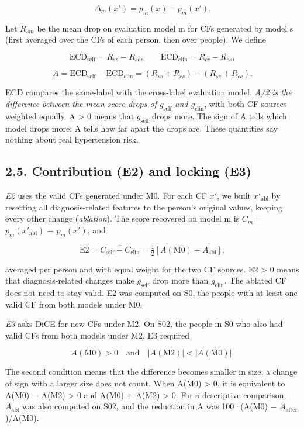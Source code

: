 \documentclass[
  11pt,
]{article}
\begin{document}
\[\Delta_m(x') = p_m(x) - p_m(x').\]

Let \(R_{sm}\) be the mean drop on evaluation model m for CFs generated
by model s (first averaged over the CFs of each person, then over
people). We define

\[\mathrm{ECD}_{\mathrm{self}} = R_{ss} - R_{sc}, \qquad \mathrm{ECD}_{\mathrm{clin}} = R_{cc} - R_{cs},\]

\[A = \mathrm{ECD}_{\mathrm{self}} - \mathrm{ECD}_{\mathrm{clin}} = (R_{ss}+R_{cs}) - (R_{sc}+R_{cc}).\]

ECD compares the same-label with the cross-label evaluation model.
\emph{A/2 is the difference between the mean score drops of
\(g_{\mathrm{self}}\) and \(g_{\mathrm{clin}}\)}, with both CF sources
weighted equally. A \textgreater{} 0 means that \(g_{\mathrm{self}}\)
drops more. The sign of A tells which model drops more;
\textbar A\textbar{} tells how far apart the drops are. These quantities
say nothing about real hypertension risk.

\subsection{2.5. Contribution (E2) and locking (E3)}

\emph{E2} uses the valid CFs generated under M0. For each CF \(x'\), we
built \(x'_{\mathrm{abl}}\) by resetting all diagnosis-related features
to the person's original values, keeping every other change
(\emph{ablation}). The score recovered on model m is \(C_m\) =
\(p_m(x'_{\mathrm{abl}})\) − \(p_m(x')\), and

\[\mathrm{E2} = \overline{C_{\mathrm{self}} - C_{\mathrm{clin}}} = \tfrac{1}{2}\left[A(\mathrm{M0}) - A_{\mathrm{abl}}\right],\]

averaged per person and with equal weight for the two CF sources. E2
\textgreater{} 0 means that diagnosis-related changes make
\(g_{\mathrm{self}}\) drop more than \(g_{\mathrm{clin}}\). The ablated
CF does not need to stay valid. E2 was computed on S0, the people with
at least one valid CF from both models under M0.

\emph{E3} asks DiCE for new CFs under M2. On S02, the people in S0 who
also had valid CFs from both models under M2, E3 required

\[A(\mathrm{M0}) > 0 \quad \text{and} \quad |A(\mathrm{M2})| < |A(\mathrm{M0})|.\]

The second condition means that the difference becomes smaller in size;
a change of sign with a larger size does not count. When A(M0)
\textgreater{} 0, it is equivalent to A(M0) − A(M2) \textgreater{} 0 and
A(M0) + A(M2) \textgreater{} 0. For a descriptive comparison,
\(A_{\mathrm{abl}}\) was also computed on S02, and the reduction in
\textbar A\textbar{} was 100·(\textbar A(M0)\textbar{} −
\textbar{}\(A_{\mathrm{after}}\)\textbar)/\textbar A(M0)\textbar.
\end{document}
